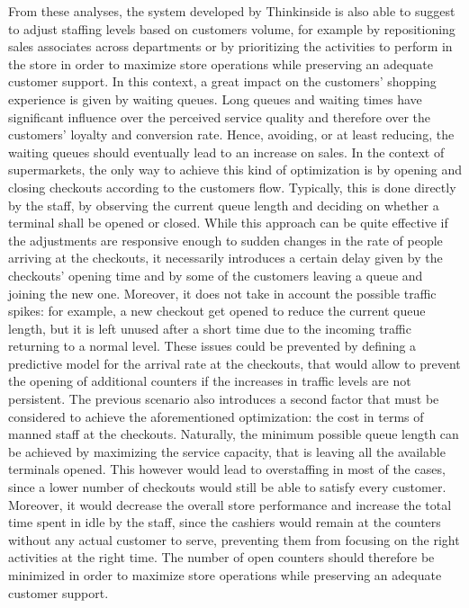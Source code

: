 From these analyses, the system developed by Thinkinside is also able to suggest to adjust staffing levels based on customers volume, for example by repositioning sales associates across departments or by prioritizing the activities to perform in the store in order to maximize store operations while preserving an adequate customer support. In this context, a great impact on the customers’ shopping experience is given by waiting queues. Long queues and waiting times have significant influence over the perceived service quality and therefore over the customers’ loyalty and conversion rate. Hence, avoiding, or at least reducing, the waiting queues should eventually lead to an increase on sales. In the context of supermarkets, the only way to achieve this kind of optimization is by opening and closing checkouts according to the customers flow. Typically, this is done directly by the staff, by observing the current queue length and deciding on whether a terminal shall be opened or closed. While this approach can be quite effective if the adjustments are responsive enough to sudden changes in the rate of people arriving at the checkouts, it necessarily introduces a certain delay given by the checkouts’ opening time and by some of the customers leaving a queue and joining the new one. Moreover, it does not take in account the possible traffic spikes: for example, a new checkout get opened to reduce the current queue length, but it is left unused after a short time due to the incoming traffic returning to a normal level. These issues could be prevented by defining a predictive model for the arrival rate at the checkouts, that would allow to prevent the opening of additional counters if the increases in traffic levels are not persistent. The previous scenario also introduces a second factor that must be considered to achieve the aforementioned optimization: the cost in terms of manned staff at the checkouts. Naturally, the minimum possible queue length can be achieved by maximizing the service capacity, that is leaving all the available terminals opened. This however would lead to overstaffing in most of the cases, since a lower number of checkouts would still be able to satisfy every customer. Moreover, it would decrease the overall store performance and increase the total time spent in idle by the staff, since the cashiers would remain at the counters without any actual customer to serve, preventing them from focusing on the right activities at the right time. The number of open counters should therefore be minimized in order to maximize store operations while preserving an adequate customer support.

